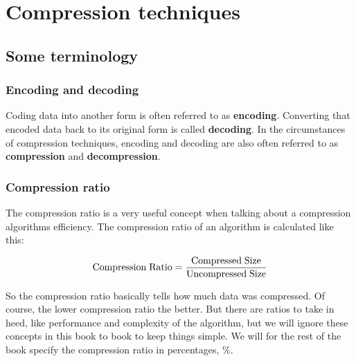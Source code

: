 \begin{comment}
  
\end{comment}

\chapter{Compression techniques}
\label{cha:compress-techn}

\begin{refsection}

\section{Some terminology}
\label{sec:some-terminology}

\subsection{Encoding and decoding}
\label{sec:encoding-decoding}

Coding data into another form is often referred to as
\textbf{encoding}. Converting that encoded data back
to its original form is called
\textbf{decoding}.  In the circumstances of compression techniques, encoding and
decoding are also often referred to as
\textbf{compression} and
\textbf{decompression}.

\subsection{Compression ratio}
\label{sec:compression-ratio}

The compression ratio is a very useful concept when talking about a
compression algorithms efficiency. The compression ratio of an
algorithm is calculated like this:

\begin{equation}
  \label{eq:compress-ratio}
  {\rm Compression\;Ratio} = \frac{\rm Compressed\;Size}{\rm Uncompressed\;Size}
\end{equation}

So the compression ratio basically tells how much data was
compressed. Of course, the lower compression ratio the better. But
there are ratios to take in heed, like performance and complexity of
the algorithm, but we will ignore these concepts in this book to book
to keep things simple. We will for the rest of the book specify the
compression ratio in percentages, $\%$\cite{Salomon:2004:DCC}.


\end{refsection}
